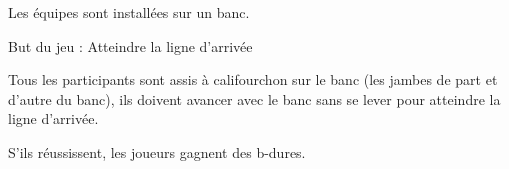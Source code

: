 \documentclass{grand-jeu}
\begin{document}
\begin{liste-materiel}
\end{liste-materiel}

\begin{installation}
Les équipes sont installées sur un banc.
\end{installation}

\begin{regles}
But du jeu : Atteindre la ligne d’arrivée

Tous les participants sont assis à califourchon sur le banc (les jambes de part et d’autre du banc), ils doivent avancer avec le banc sans se lever pour atteindre la ligne d’arrivée.

S'ils réussissent, les joueurs gagnent des b-dures. 
\end{regles}

\begin{imaginaire}

\end{imaginaire}

\begin{moments-stop}
\end{moments-stop}
\end{document}
